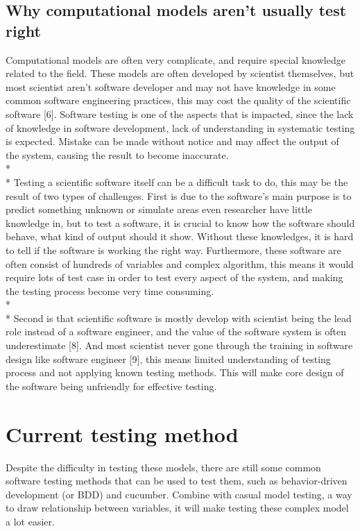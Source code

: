 \subsection{Why computational models aren't usually test right}
Computational models are often very complicate, and require special knowledge related to the field. These models are often developed by scientist themselves, but most scientist aren’t software developer and may not have knowledge in some common software engineering practices, this may cost the quality of the scientific software [6]. Software testing is one of the aspects that is impacted, since the lack of knowledge in software development, lack of understanding in systematic testing is expected. Mistake can be made without notice and may affect the output of the system, causing the result to become inaccurate.\\*\\*
Testing a scientific software itself can be a difficult task to do, this may be the result of two types of challenges. First is due to the software’s main purpose is to predict something unknown or simulate areas even researcher have little knowledge in, but to test a software, it is crucial to know how the software should behave, what kind of output should it show. Without these knowledges, it is hard to tell if the software is working the right way. Furthermore, these software are often consist of hundreds of variables and complex algorithm, this means it would require lots of test case in order to test every aspect of the system, and making the testing process become very time consuming.\\*\\*
Second is that scientific software is mostly develop with scientist being the lead role instead of a software engineer, and the value of the software system is often underestimate [8]. And most scientist never gone through the training in software design like software engineer [9], this means limited understanding of testing process and not applying known testing methods. This will make core design of the software being unfriendly for effective testing. 
\section{Current testing method}
Despite the difficulty in testing these models, there are still some common software testing methods that can be used to test them, such as behavior-driven development (or BDD) and cucumber. Combine with casual model testing, a way to draw relationship between variables, it will make testing these complex model a lot easier.
